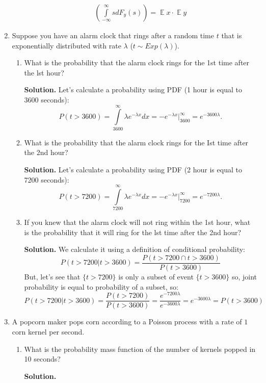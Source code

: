 \documentclass[a4paper, 12pt]{article}
\DeclareMathOperator{\E}{\mathbb{E}}
\newcommand{\rbra}[1]{\left( #1 \right)}
\newcommand{\task}[2]{
    \item #1

    \textbf{Solution. } #2
}
\begin{document}
\begin{enumerate}
\begin{enumerate}
{\begin{multline*}
                      \rbra{\int\limits_{-\infty}^{\infty} s dF_y(s)} = \E x \cdot \E y
                  \end{multline*}
              }
          \end{enumerate}
    \item Suppose you have an alarm clock that rings after a random time $t$ that is exponentially
          distributed with rate $\lambda$ ($t \sim Exp(\lambda)$).
          \begin{enumerate}
              \task{What is the probability that the alarm clock rings for the 1st time after the lst hour?
              }
              {
              Let's calculate a probability using PDF (1 hour is equal to 3600 seconds):
              \[
                  P(t > 3600) = \int\limits_{3600}^{\infty} \lambda e^{-\lambda x} dx =
                  -e^{-\lambda x} \big|_{3600}^{\infty} = e^{-3600 \lambda}.
              \]
              }
              \task{What is the probability that the alarm clock rings for the Ist time after the 2nd hour?}
              {
              Let's calculate a probability using PDF (2 hour is equal to 7200 seconds):
              \[
                  P(t > 7200) = \int\limits_{7200}^{\infty} \lambda e^{-\lambda x} dx =
                  -e^{-\lambda x} \big|_{7200}^{\infty} = e^{-7200 \lambda}.
              \]
              }
              \task{If you knew that the alarm clock will not ring within the 1st hour, what is the probability
                  that it will ring for the lst time after the 2nd hour?}
              {
                  We calculate it using a definition of conditional probability:
                  \[
                      P(t > 7200 | t > 3600) = \frac{P(t > 7200 \cap t > 3600)}{P(t > 3600)}
                  \]
                  But, let's see that $\{t > 7200 \}$ is only a subset of event $\{ t > 3600 \}$ so,
                  joint probability is equal to probability of a subset, so:
                  \[
                      P(t > 7200 | t > 3600) = \frac{P(t > 7200)}{P(t > 3600)} = \frac{e^{-7200 \lambda}}{e^{-3600 \lambda}} = e^{-3600 \lambda} = P(t > 3600)
                  \]
              }
          \end{enumerate}
    \item A popcorn maker pops corn according to a Poisson process with a rate of $1$ corn kernel per
          second.
          \begin{enumerate}
              \task{What is the probability mass function of the number of kernels popped in 10 seconds?}

\end{enumerate}
\end{enumerate}
\end{document}
